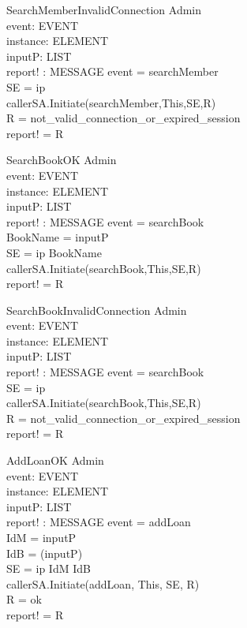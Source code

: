 \begin{schema}{SearchMemberInvalidConnection}
\Xi Admin \\
event: EVENT \\
instance: ELEMENT \\
inputP: LIST \\
report! : MESSAGE 
\where event = searchMember \\
SE = \lseq ip \rseq \\
callerSA.Initiate(searchMember,This,SE,R) \\
R = not\_valid\_connection\_or\_expired\_session \\ 
report! = R
\end{schema}

\begin{schema}{SearchBookOK}
\Xi Admin \\
event: EVENT \\
instance: ELEMENT \\
inputP: LIST \\
report! : MESSAGE 
\where event = searchBook \\
BookName = \head inputP \\
SE = \lseq ip BookName \rseq \\
callerSA.Initiate(searchBook,This,SE,R) \\
report! = R
\end{schema}

\begin{schema}{SearchBookInvalidConnection}
\Xi Admin \\
event: EVENT \\
instance: ELEMENT \\
inputP: LIST \\
report! : MESSAGE 
\where event = searchBook \\
SE = \lseq ip \rseq \\
callerSA.Initiate(searchBook,This,SE,R) \\
R = not\_valid\_connection\_or\_expired\_session \\ 
report! = R
\end{schema}

\begin{schema} {AddLoanOK}
\Xi Admin \\
event: EVENT \\
instance: ELEMENT \\
inputP: LIST \\
report! : MESSAGE 
\where event = addLoan \\
IdM = \head inputP \\ 
IdB = \head (\tail inputP) \\ 
SE = \lseq ip IdM IdB \rseq \\
callerSA.Initiate(addLoan, This, SE, R)\\
R = ok \\
report! = R 
\end{schema}

